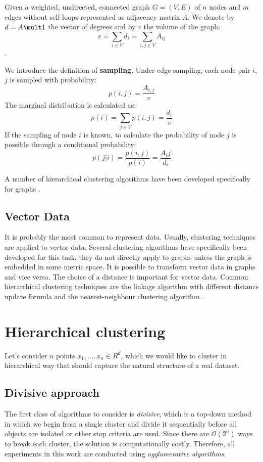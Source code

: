 Given a weighted, undirected, connected graph $G = (V, E)$ of $n$ nodes and $m$ edges without self-loops represented as adjacency matrix $A$. We denote by $d=A \mult 1$ the vector of degrees and by $v$ the volume of the graph: $$v=\sum_{i \in V}d_i=\sum_{i,j \in V }A_{ij}$$.

We introduce the definition of \textbf{sampling}. Under edge sampling, each node pair $i$, $j$ is sampled with probability: $$p(i,j)=\frac{A_{i,j}}{v}$$ 
The marginal distribution is calculated as: $$p(i)=\sum_{j \in V}p(i,j)=\frac{d_i}{v}$$ 
If the sampling of node $i$ is known, to calculate the probability of node $j$ is possible through a conditional probability: $$p(j|i)=\frac{p(i,j)}{p(i)}=\frac{A_ij}{d_i}$$

A number of hierarchical clustering algorithms have been developed specifically for graphs \cite{Newman} \cite{Bonald2018} \cite{Newman_2004} \cite{Pascal2005} \cite{Tremblay2014}.

\subsection{Vector Data}
It is probably the most common to represent data. Usually, clustering techniques are applied to vector data. Several clustering algorithms have specifically been developed for this task, they do not directly apply to graphs 
unless the graph is embedded in some metric space. It is possible to transform vector data in graphs and vice versa. The choice of a distance is important for vector data. Common hierarchical clustering techniques are the linkage algorithm with different distance update formula and the nearest-neighbour clustering algorithm \cite{Ward1963HierarchicalGT} \cite{müllner2011modern}.

\section{Hierarchical clustering}
Let's consider $n$ points $x_1, \dots, x_n \in {R}^{d}$, which we would like to cluster in hierarchical way that should capture the natural structure of a real dataset.

\subsection{Divisive approach}
The first class of algorithms to consider is \textit{divisive}, which is a top-down method in which we begin from a single cluster and divide it sequentially before all objects are isolated or other stop criteria are used.
Since there are $\mathcal{O}(2^n)$ ways to break each cluster, the solution is computationally costly.
Therefore, all experiments in this work are conducted using \textit{agglomerative algorithms}.

